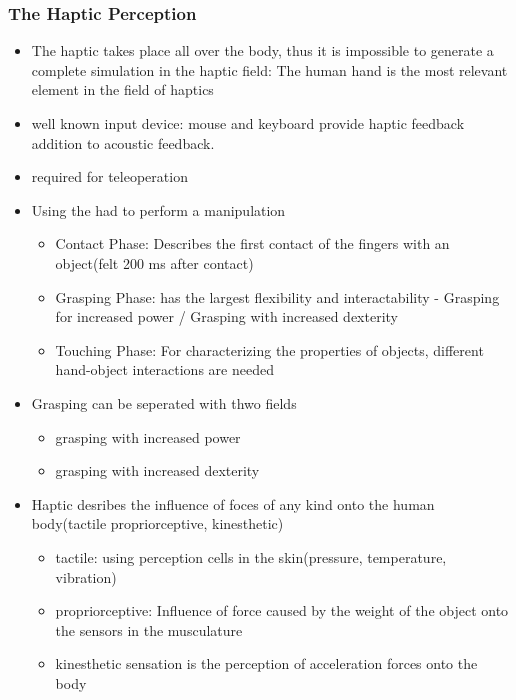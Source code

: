 \documentclass{standalone}
\begin{document}
\subsubsection{The Haptic Perception}
\begin{itemize}
	\item The haptic takes place all over the body, thus it is impossible to generate a complete simulation in the haptic field: The human hand is the most relevant element in the field of haptics
	\item well known input device: mouse and keyboard provide haptic feedback addition to acoustic feedback.
	\item required for teleoperation
	\item Using the had to perform a manipulation
	\begin{itemize}
		\item Contact Phase: Describes the first contact of the fingers with an object(felt 200 ms after contact)
		\item Grasping Phase: has the largest flexibility and interactability
		- Grasping for increased power / Grasping with increased dexterity
		\item Touching Phase: For characterizing the properties of objects, different hand-object interactions are needed
	\end{itemize}
	\item Grasping can be seperated with thwo fields
	\begin{itemize}
		\item grasping with increased power
		\item grasping with increased dexterity
	\end{itemize}
	\item Haptic desribes the influence of foces of any kind onto the human body(tactile propriorceptive, kinesthetic)
	\begin{itemize}
		\item tactile: using perception cells in the skin(pressure, temperature, vibration)
		\item propriorceptive: Influence of force caused by the weight of the object onto the sensors in the musculature
		\item kinesthetic sensation is the perception of acceleration forces onto the body 
	\end{itemize}
\end{itemize}
\end{document}
